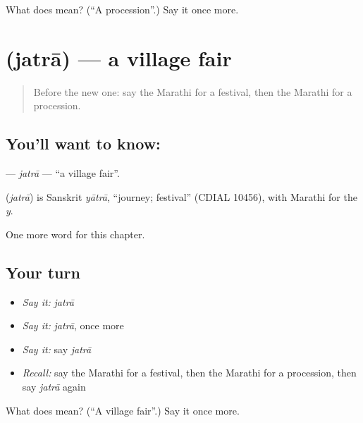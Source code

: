 \begin{tcolorbox}[breakable,colback=teal!4,colframe=teal!35!black,title={Before you move on}]
What does  mean? (\textquotedblleft{}A procession\textquotedblright{}.) Say it once more.
\end{tcolorbox}
\section[\texorpdfstring{\mr{जत्रा} (jatrā)}{जत्रा (jatrā)}]{ (jatrā) — a village fair}

\label{lesson:MR-C248-jatra}



\begin{quote}
Before the new one: say the Marathi for a festival, then the Marathi for a procession.
\end{quote}

\subsection*{You'll want to know: }
\textbf{} — \emph{jatrā} — \textquotedblleft{}a village fair\textquotedblright{}.

\begin{cousinweb}
\textbf{} (\emph{jatrā}) is Sanskrit \emph{yātrā}, \textquotedblleft{}journey; festival\textquotedblright{} (CDIAL 10456), with Marathi \textbf{} for the \emph{y}.
\end{cousinweb}

\begin{grammarlens}[title={What you've built}]
One more word for this chapter.
\end{grammarlens}

\subsection*{Your turn}
\begin{itemize}
\raggedright
  \item \emph{Say it:} \emph{jatrā}
  \item \emph{Say it:} \emph{jatrā}, once more
  \item \emph{Say it:} say \emph{jatrā}
  \item \emph{Recall:} say the Marathi for a festival, then the Marathi for a procession, then say \emph{jatrā} again
\end{itemize}

\begin{tcolorbox}[breakable,colback=teal!4,colframe=teal!35!black,title={Before you move on}]
What does  mean? (\textquotedblleft{}A village fair\textquotedblright{}.) Say it once more.
\end{tcolorbox}
